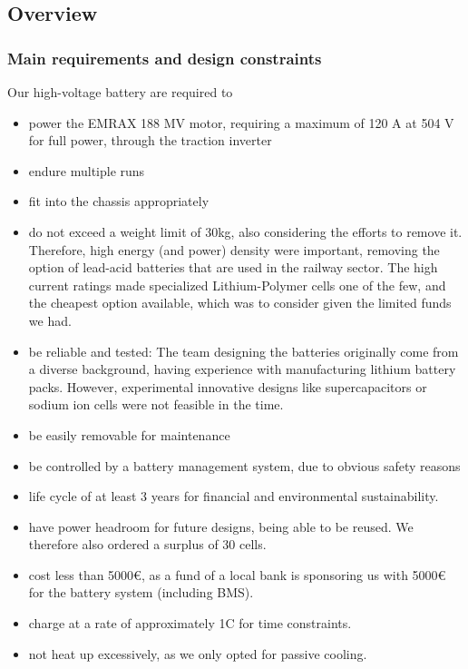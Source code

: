 \subsection{Overview}
\graphicspath{ {./texfiles/electrical/eimc/} }

\subsubsection*{Main requirements and design constraints}
Our high-voltage battery are required to 
\begin{itemize}
    \item power the EMRAX 188 MV motor, requiring a maximum of 120 A at 504 V for full power, through the traction inverter
    \item endure multiple runs 
    \item fit into the chassis appropriately
    \item do not exceed a weight limit of 30kg, also considering the efforts to remove it. Therefore, high energy (and power) density were important, removing the option of lead-acid batteries that are used in the railway sector. The high current ratings made specialized Lithium-Polymer cells one of the few, and the cheapest option available, which was to consider given the limited funds we had.
    \item be reliable and tested: The team designing the batteries originally come from a diverse background, having experience with manufacturing lithium battery packs. However, experimental innovative designs like supercapacitors or sodium ion cells were not feasible in the time. 
    \item be easily removable for maintenance
    \item be controlled by a battery management system, due to obvious safety reasons
    \item life cycle of at least 3 years for financial and environmental sustainability.
    \item have power headroom for future designs, being able to be reused. We therefore also ordered a surplus of 30 cells.
    \item cost less than 5000€, as a fund of a local bank is sponsoring us with 5000€ for the battery system (including BMS).
    \item charge at a rate of approximately 1C for time constraints.
    \item not heat up excessively, as we only opted for passive cooling.
\end{itemize}

